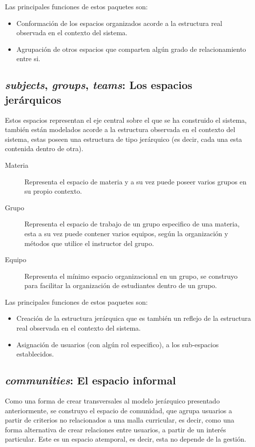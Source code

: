 Las principales funciones de estos paquetes son:

\begin{itemize}
\item Conformación de los espacios organizados acorde a la estructura real
observada en el contexto del sistema.
\item Agrupación de otros espacios que comparten algún grado de relacionamiento
entre si.
\end{itemize}

\subsection{\emph{subjects}, \emph{groups}, \emph{teams}: Los espacios
jerárquicos}
Estos espacios representan el eje central sobre el que se ha construido el
sistema, también están modelados acorde a la estructura observada en el contexto
del sistema, estas poseen una estructura de tipo jerárquico (es decir, cada una
esta contenida dentro de otra).

\begin{description}
\item [Materia] Representa el espacio de materia y a su vez puede poseer varios
grupos en su propio contexto.
\item [Grupo] Representa el espacio de trabajo de un grupo especifico de una
materia, esta a su vez puede contener varios equipos, según la organización y
métodos que utilice el instructor del grupo.
\item [Equipo] Representa el mínimo espacio organizacional en un grupo, se
construyo para facilitar la organización de estudiantes dentro de un grupo.
\end{description}

Las principales funciones de estos paquetes son:

\begin{itemize}
\item Creación de la estructura jerárquica que es también un reflejo de la
estructura real observada en el contexto del sistema.
\item Asignación de usuarios (con algún rol especifico), a los sub-espacios
establecidos.
\end{itemize}

\subsection{\emph{communities}: El espacio informal}
Como una forma de crear transversales al modelo jerárquico presentado
anteriormente, se construyo el espacio de comunidad, que agrupa usuarios a
partir de criterios no relacionados a una malla curricular, es decir, como una
forma alternativa de crear relaciones entre usuarios, a partir de un interés
particular. Este es un espacio atemporal, es decir, esta no depende de la
gestión.

